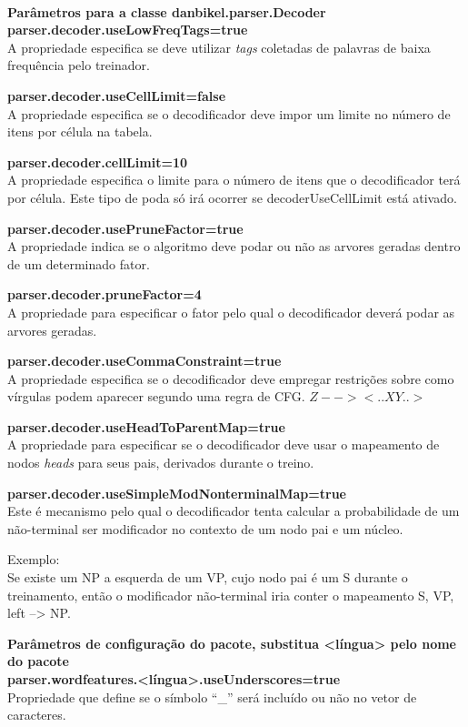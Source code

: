 \HRule \\

\textbf{Parâmetros para a classe danbikel.parser.Decoder}\\

\textbf{parser.decoder.useLowFreqTags=true}\\
A propriedade especifica se deve utilizar \emph{tags} coletadas de palavras de baixa frequência pelo treinador.

\textbf{parser.decoder.useCellLimit=false}\\
A propriedade especifica se o decodificador deve impor um limite no número de itens por célula na tabela.

\textbf{parser.decoder.cellLimit=10}\\
A propriedade especifica o limite para o número de itens que o decodificador terá por célula. Este tipo de poda só irá ocorrer se decoderUseCellLimit está ativado.

\textbf{parser.decoder.usePruneFactor=true}\\
A propriedade indica se o algoritmo deve podar ou não as arvores geradas dentro de um determinado fator.

\textbf{parser.decoder.pruneFactor=4}\\
A propriedade para especificar o fator pelo qual o decodificador deverá podar as arvores geradas. 

\textbf{parser.decoder.useCommaConstraint=true}\\
A propriedade  especifica se o decodificador deve empregar restrições sobre como vírgulas podem aparecer segundo uma regra de CFG.
$Z --> <.. X Y..>$

\textbf{parser.decoder.useHeadToParentMap=true}\\
A propriedade para especificar se o decodificador deve usar o mapeamento de nodos \emph{heads} para seus pais, derivados durante o treino.

\textbf{parser.decoder.useSimpleModNonterminalMap=true}\\
Este é mecanismo pelo qual o decodificador tenta calcular a probabilidade de um não-terminal ser modificador no contexto de um nodo pai e um núcleo.

Exemplo:\\
Se existe um NP a esquerda de um VP, cujo nodo pai é um S durante o treinamento, então o modificador não-terminal iria conter o mapeamento S, VP, left --> NP.

\textbf{Parâmetros de configuração do pacote, substitua <língua> pelo nome do pacote}\\
\textbf{parser.wordfeatures.<língua>.useUnderscores=true}\\
Propriedade que define se o símbolo ``\_'' será incluído ou não no vetor de caracteres.

